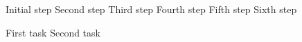 \documentclass{article}
\begin{document}
\begin{algorithm}
\caption{Frequency 3 Numbering}\label{alg:freq3}
\begin{algorithmic}[3]
\State Initial step
\State Second step
\State Third step
\State Fourth step
\State Fifth step
\State Sixth step
\end{algorithmic}
\end{algorithm}

\begin{algorithm}
\caption{Unnumbered Pseudocode}\label{alg:unnum}
\begin{algorithmic}
\State First task
\State Second task
\end{algorithmic}
\end{algorithm}
\end{document}
